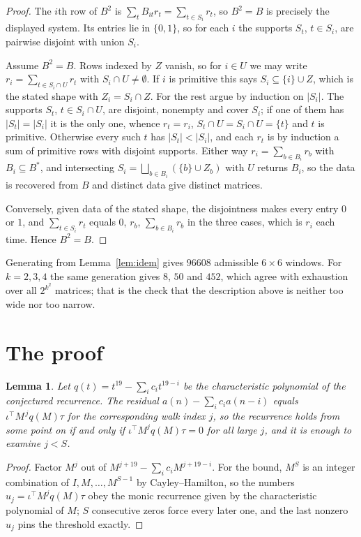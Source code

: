 \documentclass[11pt,a4paper]{article}
\theoremstyle{plain}
\newtheorem{lemma}[theorem]{Lemma}
\theoremstyle{definition}
\begin{document}
\begin{proof}
The $i$th row of $B^2$ is $\sum_t B_{it}r_t=\sum_{t\in S_i}r_t$, so $B^2=B$ is precisely the
displayed system. Its entries lie in $\{0,1\}$, so for each $i$ the supports $S_t$,
$t\in S_i$, are pairwise disjoint with union $S_i$.

Assume $B^2=B$. Rows indexed by $Z$ vanish, so for $i\in U$ we may write
$r_i=\sum_{t\in S_i\cap U}r_t$ with $S_i\cap U\neq\emptyset$. If $i$ is primitive this says
$S_i\subseteq\{i\}\cup Z$, which is the stated shape with $Z_i=S_i\cap Z$. For the rest argue
by induction on $|S_i|$. The supports $S_t$, $t\in S_i\cap U$, are disjoint, nonempty and
cover $S_i$; if one of them has $|S_t|=|S_i|$ it is the only one, whence $r_t=r_i$,
$S_t\cap U=S_i\cap U=\{t\}$ and $t$ is primitive. Otherwise every such $t$ has
$|S_t|<|S_i|$, and each $r_t$ is by induction a sum of primitive rows with disjoint supports.
Either way $r_i=\sum_{b\in B_i}r_b$ with $B_i\subseteq B^{\ast}$, and intersecting
$S_i=\bigsqcup_{b\in B_i}(\{b\}\cup Z_b)$ with $U$ returns $B_i$, so the data is recovered
from $B$ and distinct data give distinct matrices.

Conversely, given data of the stated shape, the disjointness makes every entry $0$ or $1$, and
$\sum_{t\in S_i}r_t$ equals $0$, $r_b$, $\sum_{b\in B_i}r_b$ in the three cases, which is
$r_i$ each time. Hence $B^2=B$.
\end{proof}

Generating from Lemma~\ref{lem:idem} gives $96608$ admissible $6\times6$ windows. For
$k=2,3,4$ the same generation gives $8$, $50$ and $452$, which agree with exhaustion over all
$2^{k^2}$ matrices; that is the check that the description above is neither too wide nor too
narrow.

\section{The proof}

\begin{lemma}\label{lem:crit}
Let $q(t)=t^{19}-\sum_i c_it^{19-i}$ be the characteristic polynomial of the
conjectured recurrence. The residual $a(n)-\sum_ic_ia(n-i)$ equals
$\iota^{\!\top}M^{\,j}q(M)\tau$ for the corresponding walk index $j$, so the recurrence
holds from some point on if and only if $\iota^{\!\top}M^{j}q(M)\tau=0$ for all large $j$,
and it is enough to examine $j<S$.
\end{lemma}

\begin{proof}
Factor $M^{j}$ out of $M^{j+19}-\sum_ic_iM^{j+19-i}$. For the bound, $M^{S}$
is an integer combination of $I,M,\dots,M^{S-1}$ by Cayley--Hamilton, so the numbers
$u_j=\iota^{\!\top}M^{j}q(M)\tau$ obey the monic recurrence given by the characteristic
polynomial of $M$; $S$ consecutive zeros force every later one, and the last nonzero $u_j$
pins the threshold exactly.
\end{proof}
\end{document}
